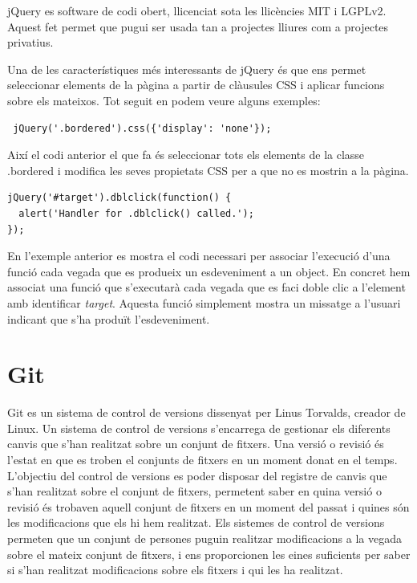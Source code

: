 jQuery es software de codi obert, llicenciat sota les llicències MIT i LGPLv2. Aquest fet permet que pugui ser usada tan a projectes lliures com a projectes privatius. 

Una de les característiques més interessants de jQuery és que ens permet seleccionar elements de la pàgina a partir de clàusules CSS i aplicar funcions sobre els mateixos. Tot seguit en podem veure alguns exemples: 

\begin{lstlisting}
 jQuery('.bordered').css({'display': 'none'});
\end{lstlisting}

Així el codi anterior el que fa és seleccionar tots els elements de la classe .bordered i modifica les seves propietats CSS per a que no es mostrin a la pàgina. 

\begin{lstlisting}
jQuery('#target').dblclick(function() {
  alert('Handler for .dblclick() called.');
});
\end{lstlisting}

En l'exemple anterior es mostra el codi necessari per associar l'execució d'una funció cada vegada que es produeix un esdeveniment a un object. En concret hem associat una funció que s'executarà cada vegada que es faci doble clic a l'element amb identificar \emph{target}. Aquesta funció simplement mostra un missatge a l'usuari indicant que s'ha produït l'esdeveniment. 

\section{Git}

Git es un sistema de control de versions dissenyat per Linus Torvalds, creador de Linux. Un sistema de control de versions s'encarrega de gestionar els diferents canvis que s'han realitzat sobre un conjunt de fitxers. Una versió o revisió és l'estat en que es troben el conjunts de fitxers en un moment donat en el temps. L'objectiu del control de versions es poder disposar del registre de canvis que s'han realitzat sobre el conjunt de fitxers, permetent saber en quina versió o revisió és trobaven aquell conjunt de fitxers en un moment del passat i quines són les modificacions que els hi hem realitzat. Els sistemes de control de versions permeten que un conjunt de persones puguin realitzar modificacions a la vegada sobre el mateix conjunt de fitxers, i ens proporcionen les eines suficients per saber si s'han realitzat modificacions sobre els fitxers i qui les ha realitzat. 


